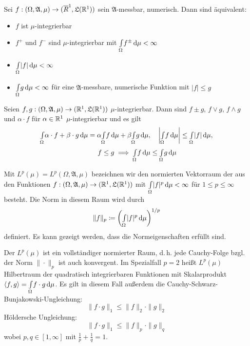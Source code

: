 \documentclass{cheat-sheet}
\newcommand{\Alg}{\mathfrak{A}} %
\newcommand{\LebAlg}{\mathfrak{L}} %
\newcommand{\IntOmu}[1]{\Int{\Omega}{}{#1}{\mu}} %
\begin{document}

\begin{satz}
  Sei $f : (\Omega, \Alg, \mu) \to (\overline{R}^1, \LebAlg(\R^1))$ sein $\Alg$-messbar, numerisch. Dann sind äquivalent:
  \begin{itemize}
    \item $f$ ist $\mu$-integrierbar
    \item $f^+$ und $f^-$ sind $\mu$-integrierbar mit $\IntOmu{f^{\pm}} < \infty$
    \item $\IntOmu{|f|} < \infty$
    \item $\IntOmu{g} < \infty$ für eine $\Alg$-messbare, numerische Funktion mit $|f| \leq g$
  \end{itemize}
\end{satz}

\begin{satz}
  Seien $f, g : (\Omega, \Alg, \mu) \to (\R^1, \LebAlg(\R^1))$ $\mu$-integrierbar. Dann sind $f \pm g$, $f \vee g$, $f \wedge g$ und $\alpha \cdot f$ für $\alpha \in \mathbb{R}^1$ $\mu$-integrierbar und es gilt
  \begin{align*}
    \IntOmu{\alpha \cdot f + \beta \cdot g} = \alpha \IntOmu{f} + \beta \IntOmu{g}, & \quad
    \left| \IntOmu{f} \right| \leq \IntOmu{|f|}, \\
    f \leq g \implies \IntOmu{f} &\leq \IntOmu{g}
  \end{align*}
\end{satz}

\begin{defn}
  Mit $L^p(\mu) = L^p(\Omega, \Alg, \mu)$ bezeichnen wir den normierten Vektorraum der aus den Funktionen $f : (\Omega, \Alg, \mu) \to (\R^1, \LebAlg(\R^1))$ mit $\IntOmu{|f|^p} < \infty$ für $1 \leq p \leq \infty$ besteht. Die Norm in diesem Raum wird durch
  \[ \|f\|_p \coloneqq \left( \IntOmu{|f|^p} \right)^{1/p} \]
  definiert. Es kann gezeigt werden, dass die Normeigenschaften erfüllt sind.
\end{defn}


\begin{bem}
  Der $L^p(\mu)$ ist ein vollständiger normierter Raum, d.\,h. jede Cauchy-Folge bzgl. der Norm $\| \cdot \|_p$ ist auch konvergent. Im Spezialfall $p = 2$ heißt $L^p(\mu)$ Hilbertraum der quadratisch integrierbaren Funktionen mit Skalarprodukt $\langle f , g \rangle = \IntOmu{f \cdot g}$. Es gilt in diesem Fall außerdem die Cauchy-Schwarz-Bunjakowski-Ungleichung:
  \[ \| f \cdot g \|_{1} \leq \|f\|_2 \cdot \|g\|_2 \]
  Höldersche Ungleichung:
  \[ \| f \cdot g \|_{1} \leq \|f\|_p \cdot \|g\|_q \]
  wobei $p, q \in [1, \infty]$ mit $\tfrac{1}{p} + \tfrac{1}{q} = 1$.
\end{bem}
\end{document}
